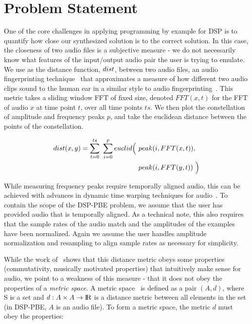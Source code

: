 
\section{Problem Statement}

One of the core challenges in applying programming by example for DSP is to quantify how close our synthesized solution is to the correct solution.
In this case, the closeness of two audio files is a subjective measure - we do not necessarily know what features of the input/output audio pair the user is trying to emulate.
We use as the distance function, $dist$, between two audio files, an audio fingerprinting technique~\cite{SantolucitoFARM} that approximates a measure of how different two audio clips sound to the human ear in a similar style to audio fingerprinting~\cite{wang2003industrial,fingerprinting}.
This metric takes a sliding window FFT of fixed size, denoted $FFT(x,t)$ for the FFT of audio $x$ at time point $t$, over all time points $ts$.
We then plot the constellation of amplitude and frequency peaks $p$, and take the euclidean distance between the points of the constellation.

%
\begin{align*}
\distFxn(x,y) =  \sum_{t=0}^{ts}\ \sum_{i=0}^{p} euclid\Big(\ &peak(i,FFT(x,t)), \\ &peak(i,FFT(y,t))\ \Big)
\end{align*}
%

While measuring frequency peaks require temporally aligned audio, this can be achieved with advances in dynamic time warping techniques for audio~\cite{carabias2015audio}.
To contain the scope of the DSP-PBE problem, we assume that the user has provided audio that is temporally aligned.
As a technical note, this also requires that the sample rates of the audio match and the amplitudes of the examples have been normalized.
Again we assume the user handles amplitude normalization and resampling to align sample rates as necessary for simplicity.

While the work of~\cite{SantolucitoFARM} shows that this distance metric obeys some properties (commutativity, musically motivated properties) that intuitively make sense for audio,
  we point to a weakness of this measure - that it does not obey the properties of a \textit{metric space}.
A metric space~\cite{frechet1906quelques} is defined as a pair $(A,d)$, where S is a set and $d:A \times A \to {\rm I\!R}$ is a distance metric between all elements in the set (in DSP-PBE, $A$ is an audio file).
To form a metric space, the metric $d$ must obey the properties:


